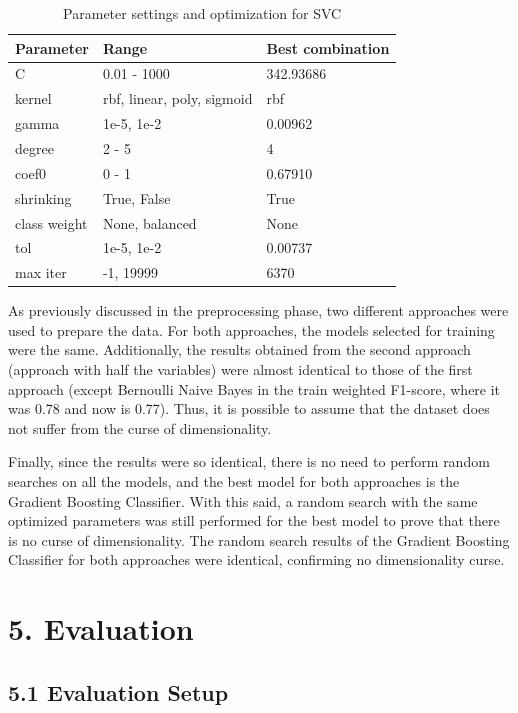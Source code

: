 \documentclass[a4paper,oneside,bibliography=totoc]{scrbook}
\begin{document}
\begin{table}[H]
	\centering
	\fontsize{10}{12}\selectfont
	\begin{tabular}{|l|l|l|}
		\hline \textbf{Parameter} & \textbf{Range} & \textbf{Best combination} \\
		\hline C & 0.01 - 1000 & 342.93686 \\
		\hline kernel & rbf, linear, poly, sigmoid & rbf \\
		\hline gamma & 1e-5, 1e-2 & 0.00962 \\
		\hline degree & 2 - 5 & 4 \\
		\hline coef0 & 0 - 1 & 0.67910 \\
		\hline shrinking & True, False & True \\
		\hline class weight & None, balanced & None \\
		\hline tol & 1e-5, 1e-2 & 0.00737 \\
		\hline max iter & -1, 19999 & 6370 \\
		\hline
	\end{tabular}
	\caption{Parameter settings and optimization for SVC}
	\label{tab:t4}
\end{table}

As previously discussed in the preprocessing phase, two different approaches were used to prepare the data. For both approaches, the models selected for training were the same. Additionally, the results obtained from the second approach (approach with half the variables) were almost identical to those of the first approach (except Bernoulli Naive Bayes in the train weighted F1-score, where it was 0.78 and now is 0.77). Thus, it is possible to assume that the dataset does not suffer from the curse of dimensionality. 

Finally, since the results were so identical, there is no need to perform random searches on all the models, and the best model for both approaches is the Gradient Boosting Classifier. With this said, a random search with the same optimized parameters was still performed for the best model to prove that there is no curse of dimensionality. The random search results of the Gradient Boosting Classifier for both approaches were identical, confirming no dimensionality curse.



\section*{5. Evaluation}

\subsection*{5.1 Evaluation Setup}
\end{document}
